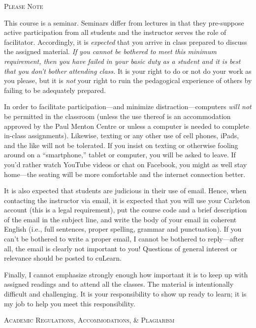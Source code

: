 \documentclass[12pt]{article}
\begin{document}
{\large \textsc{Please Note}}

This course is a seminar. Seminars differ from lectures in that they pre-suppose active participation from all students and the instructor serves the role of facilitator. Accordingly, it is \textit{expected} that you arrive in class prepared to discuss the assigned material. \textit{If you cannot be bothered to meet this minimum requirement, then you have failed in your basic duty as a student and it is best that you don't bother attending class.} It is your right to do or not do your work as you please, but it is \textit{not} your right to ruin the pedagogical experience of others by failing to be adequately prepared.

In order to facilitate participation---and minimize distraction---computers \emph{will not} be permitted in the classroom (unless the use thereof is an accommodation approved by the Paul Menton Centre or unless a computer is needed to complete in-class assignments). Likewise, texting or any other use of cell phones, iPads, and the like will not be tolerated. If you insist on texting or otherwise fooling around on a ``smartphone,'' tablet or computer, you will be asked to leave. If you'd rather watch YouTube videos or chat on Facebook, you might as well stay home---the seating will be more comfortable and the internet connection better.

It is also expected that students are judicious in their use of email. Hence, when contacting the instructor via email, it is expected that you will use your Carleton account (this is a legal requirement), put the course code and a brief description of the email in the subject line, and write the body of your email in coherent English (i.e., full sentences, proper spelling, grammar and punctuation). If you can't be bothered to write a proper email, I cannot be bothered to reply---after all, the email is clearly not important to you! Questions of general interest or relevance should be posted to cuLearn.

Finally, I cannot emphasize strongly enough how important it is to keep up with assigned readings and to attend all the classes. The material is intentionally difficult and challenging. It is your responsibility to show up ready to learn; it is my job to help you meet this responsibility.

\vspace{.125in}

{\Large \textsc{Academic Regulations, Accommodations, \& Plagiarism}}
\end{document}
